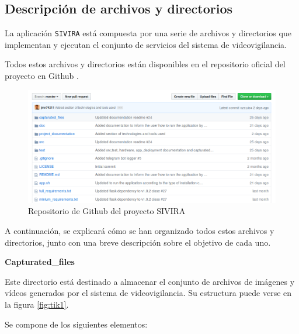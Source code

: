 





\subsection{Descripción de archivos y directorios}

\pagestyle{miEstilo506}

La aplicación \texttt{SIVIRA} está compuesta por una serie de archivos y directorios que implementan y ejecutan el conjunto de servicios del sistema de videovigilancia.

Todos estos archivos y directorios están disponibles en el repositorio oficial del proyecto en Github \cite{ref1}.

\begin{figure}[h]
	\centering
	\includegraphics[scale=0.5]{images/43}
	\caption{Repositorio de Github del proyecto SIVIRA}
\end{figure}

A continuación, se explicará cómo se han organizado todos estos archivos y directorios, junto con una breve descripción sobre el objetivo de cada uno.

\newpage

\textbf{Capturated\_files}

Este directorio está destinado a almacenar el conjunto de archivos de imágenes y vídeos generados por el sistema de videovigilancia. Su estructura puede verse en la figura \ref{fig:tik1}.

Se compone de los siguientes elementos:

\vspace{-0.5cm}


